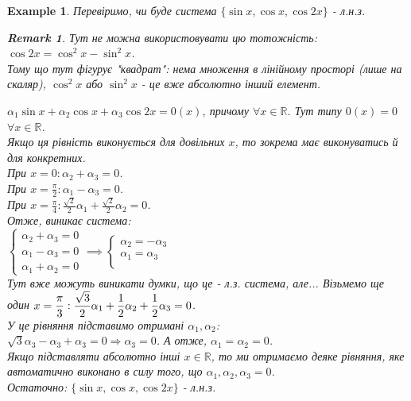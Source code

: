 \documentclass[a4paper, 10pt]{article}
\theoremstyle{theoremdd}
\newtheorem{example}[theorem]{Example}
\newtheorem{remark}[theorem]{Remark}
\begin{document}
	\begin{example}
	Перевіримо, чи буде система $\{\sin x, \cos x, \cos 2x\}$ - л.н.з.
	
	\begin{remark}
	Тут не можна використовувати цю тотожність: $\cos 2x = \cos ^2 x - \sin ^2 x$. \\ 
	Тому що тут фігурує "квадрат": нема множення в лінійному просторі (лише на скаляр), $\cos^2 x$ або $\sin^2 x$ - це вже абсолютно інший елемент.
	\end{remark}
	$\alpha_1 \sin x + \alpha_2 \cos x + \alpha_3 \cos 2x = 0(x)$, причому $\forall x \in \mathbb{R}$. Тут типу $0(x) = 0$ $\forall x \in \mathbb{R}$.\\
	Якщо ця рівність виконується для довільних $x$, то зокрема має виконуватись й для конкретних.\\
	При $\displaystyle x = 0: \alpha_2 + \alpha_3 = 0$.\\
	При $\displaystyle x = \frac{\pi}{2}: \alpha_1 - \alpha_3 = 0$.\\
	При $\displaystyle x = \frac{\pi}{4}: \frac{\sqrt{2}}{2} \alpha_1 + \frac{\sqrt{2}}{2} \alpha_2 = 0$.\\
	Отже, виникає система:\\
	$\begin{cases}
	\alpha_2 + \alpha_3 = 0\\
	\alpha_1 - \alpha_3 = 0\\
	\alpha_1 + \alpha_2 = 0
	\end{cases}
	\implies
	\begin{cases}
	\alpha_2 =  -\alpha_3\\
	\alpha_1 = \alpha_3\\
	\end{cases}
	$\\
	Тут вже можуть виникати думки, що це - л.з. система, але... Візьмемо ще один $\displaystyle x = \frac{\pi}{3}: \\ \frac{\sqrt{3}}{2}\alpha_1 + \frac{1}{2}\alpha_2 + \frac{1}{2}\alpha_3 = 0$.\\
	У це рівняння підставимо отримані $\alpha_1,\alpha_2$:\\
	$\sqrt{3}\alpha_3 - \alpha_3 + \alpha_3 = 0 \Rightarrow \alpha_3 = 0$. А отже, $\alpha_1 = \alpha_2 = 0$.\\
	Якщо підставляти абсолютно інші $x \in \mathbb{R}$, то ми отримаємо деяке рівняння, яке автоматично виконано в силу того, що $\alpha_1,\alpha_2,\alpha_3 = 0$.\\
	Остаточно: $\{\sin x, \cos x, \cos 2x\}$ - л.н.з.
	\end{example}
	
\end{document}
